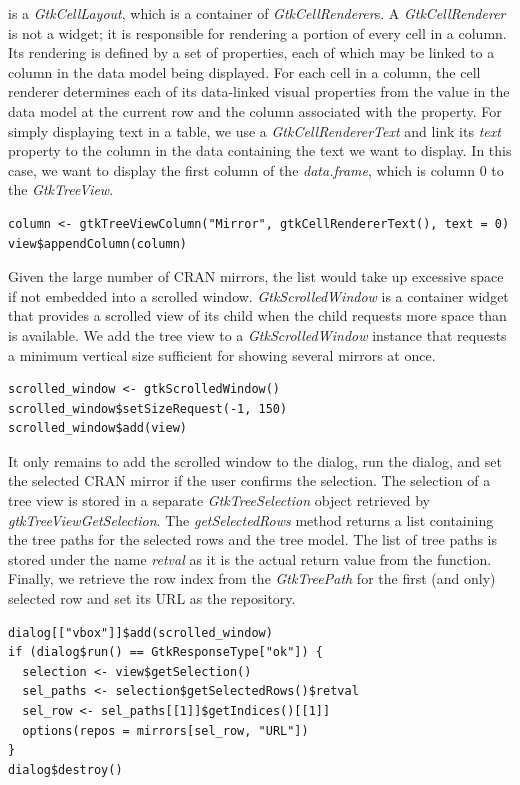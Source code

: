 \documentclass[article]{jss}
\begin{document}
is a \emph{GtkCellLayout}, which is a container of \emph{GtkCellRenderer}s. 
A \emph{GtkCellRenderer} is not a widget; it is responsible for rendering
a portion of every cell in a column. Its rendering is defined by a set of
properties, each of which may be linked to a column in the data model
being displayed. For each
cell in a column, the cell renderer determines each of its data-linked visual
properties from the value in the data model at the current
row and the column associated with the property. For simply displaying
text in a table, we use a \emph{GtkCellRendererText} and link its \emph{text}
property to the column in the data containing the text we want to display.
In this case, we want to display the first column of the \emph{data.frame},
which is column $0$ to the \emph{GtkTreeView}.
\begin{verbatim}
column <- gtkTreeViewColumn("Mirror", gtkCellRendererText(), text = 0)
view$appendColumn(column)
\end{verbatim}
Given the large number of CRAN mirrors, the list would take up excessive space
if not embedded into a scrolled window. \emph{GtkScrolledWindow} is a container 
widget that provides a scrolled view of its child when the child requests more
space than is available. We add the tree view to a \emph{GtkScrolledWindow} 
instance that requests a minimum vertical size sufficient for showing several 
mirrors at once.
\begin{verbatim}
scrolled_window <- gtkScrolledWindow()
scrolled_window$setSizeRequest(-1, 150)
scrolled_window$add(view)
\end{verbatim}
It only remains to add the scrolled window to the dialog, run the dialog, and
set the selected CRAN mirror if the user confirms the selection. The selection
of a tree view is stored in a separate \emph{GtkTreeSelection} object retrieved
by \emph{gtkTreeViewGetSelection}. The \emph{getSelectedRows} method returns a 
list containing the tree paths for the selected rows and the tree model. The 
list of tree paths is stored under the name \emph{retval} as it is the actual
return value from the  function. Finally, we retrieve the row index
from the \emph{GtkTreePath} for the first (and only) selected row and set its 
URL as the repository.
\begin{verbatim}
dialog[["vbox"]]$add(scrolled_window)
if (dialog$run() == GtkResponseType["ok"]) {
  selection <- view$getSelection()
  sel_paths <- selection$getSelectedRows()$retval
  sel_row <- sel_paths[[1]]$getIndices()[[1]]
  options(repos = mirrors[sel_row, "URL"])
}
dialog$destroy()
\end{verbatim}
\end{document}
